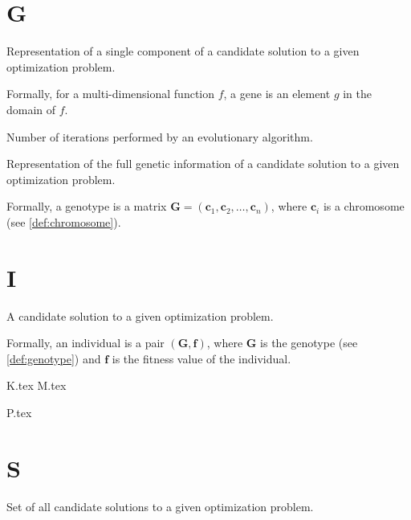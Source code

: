  \section*{G}
    \begin{definition}[Gene]
    \label{def:gene}
      Representation of a single component of a candidate solution to a given optimization problem.

      Formally, for a multi-dimensional function \(f\), a gene is an element \(g\) in the domain of
      \(f\).
    \end{definition}

    \begin{definition}[Generation]
    \label{def:generation}
      Number of iterations performed by an evolutionary algorithm.
    \end{definition}

    \begin{definition}[Genotype]
    \label{def:genotype}
      Representation of the full genetic information of a candidate solution to a given optimization
      problem.

      Formally, a genotype is a matrix \(\mathbf{G} = (\textbf{c}_1, \textbf{c}_2, \dots, 
      \textbf{c}_n)\), where \(\textbf{c}_i\) is a chromosome (see \vref{def:chromosome}).
    \end{definition}

  \section*{I}
    \begin{definition}[Individual]
    \label{def:individual}
      A candidate solution to a given optimization problem.

      Formally, an individual is a pair \((\mathbf{G}, \mathbf{f})\), where \(\mathbf{G}\) is the
      genotype (see \vref{def:genotype}) and \(\mathbf{f}\) is the fitness value of the
      individual.
    \end{definition}
    
  {K.tex}
  {M.tex}

  {P.tex}

  \section*{S}
    \begin{definition}
    \label{def:search_space}
      Set of all candidate solutions to a given optimization problem.
    \end{definition}

